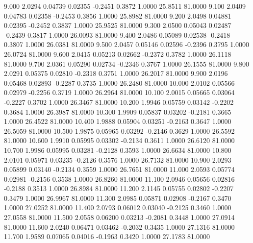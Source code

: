    9.000   2.0294   0.04739   0.02355  -0.2451   0.3872   1.0000  25.8511  81.0000
   9.100   2.0409   0.04783   0.02358  -0.2453   0.3856   1.0000  25.8982  81.0000
   9.200   2.0498   0.04881   0.02395  -0.2452   0.3837   1.0000  25.9525  81.0000
   9.300   2.0500   0.05043   0.02487  -0.2439   0.3817   1.0000  26.0093  81.0000
   9.400   2.0486   0.05089   0.02538  -0.2418   0.3807   1.0000  26.0381  81.0000
   9.500   2.0457   0.05146   0.02596  -0.2396   0.3795   1.0000  26.0724  81.0000
   9.600   2.0415   0.05213   0.02662  -0.2372   0.3782   1.0000  26.1118  81.0000
   9.700   2.0361   0.05290   0.02734  -0.2346   0.3767   1.0000  26.1555  81.0000
   9.800   2.0291   0.05375   0.02810  -0.2318   0.3751   1.0000  26.2017  81.0000
   9.900   2.0196   0.05468   0.02893  -0.2287   0.3735   1.0000  26.2480  81.0000
  10.000   2.0102   0.05566   0.02979  -0.2256   0.3719   1.0000  26.2964  81.0000
  10.100   2.0015   0.05665   0.03064  -0.2227   0.3702   1.0000  26.3467  81.0000
  10.200   1.9946   0.05759   0.03142  -0.2202   0.3684   1.0000  26.3987  81.0000
  10.300   1.9909   0.05837   0.03202  -0.2181   0.3665   1.0000  26.4522  81.0000
  10.400   1.9888   0.05904   0.03251  -0.2163   0.3647   1.0000  26.5059  81.0000
  10.500   1.9875   0.05965   0.03292  -0.2146   0.3629   1.0000  26.5592  81.0000
  10.600   1.9910   0.05995   0.03302  -0.2134   0.3611   1.0000  26.6120  81.0000
  10.700   1.9986   0.05995   0.03281  -0.2128   0.3593   1.0000  26.6634  81.0000
  10.800   2.0101   0.05971   0.03235  -0.2126   0.3576   1.0000  26.7132  81.0000
  10.900   2.0293   0.05899   0.03140  -0.2134   0.3559   1.0000  26.7651  81.0000
  11.000   2.0593   0.05774   0.02981  -0.2156   0.3538   1.0000  26.8260  81.0000
  11.100   2.0946   0.05656   0.02816  -0.2188   0.3513   1.0000  26.8984  81.0000
  11.200   2.1145   0.05755   0.02802  -0.2207   0.3479   1.0000  26.9967  81.0000
  11.300   2.0985   0.05871   0.02908  -0.2167   0.3470   1.0000  27.0252  81.0000
  11.400   2.0793   0.06012   0.03040  -0.2125   0.3460   1.0000  27.0558  81.0000
  11.500   2.0558   0.06200   0.03213  -0.2081   0.3448   1.0000  27.0914  81.0000
  11.600   2.0240   0.06471   0.03462  -0.2032   0.3435   1.0000  27.1316  81.0000
  11.700   1.9589   0.07065   0.04016  -0.1963   0.3420   1.0000  27.1783  81.0000

